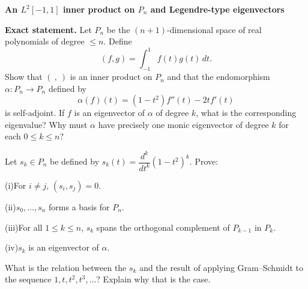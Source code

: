 \begin{problem}[CP-I-0041]
\label{prob:cp-i-0041}
\textbf{An $L^2[-1,1]$ inner product on $P_n$ and Legendre-type eigenvectors}

\textbf{Exact statement.}
\hspace*{1.5em}Let $P_n$ be the $(n+1)$-dimensional space of real polynomials of degree $\le n$. Define
\[
(f,g)=\int_{-1}^{1} f(t)g(t)\,dt.
\]
Show that $(\ ,\ )$ is an inner product on $P_n$ and that the endomorphism $\alpha:P_n\to P_n$ defined by
\[
\alpha(f)(t)=(1-t^2)f''(t)-2t f'(t)
\]
is self-adjoint.
If $f$ is an eigenvector of $\alpha$ of degree $k$, what is the corresponding eigenvalue?
Why must $\alpha$ have precisely one monic eigenvector of degree $k$ for each $0\le k\le n$?

Let $s_k\in P_n$ be defined by $s_k(t)=\dfrac{d^k}{dt^k}(1-t^2)^k$. Prove:

	\par\noindent (i)\quad For $i\ne j$, $(s_i,s_j)=0$.
	\par\noindent (ii)\quad $s_0,\dots,s_n$ forms a basis for $P_n$.
	\par\noindent (iii)\quad For all $1\le k\le n$, $s_k$ spans the orthogonal complement of $P_{k-1}$ in $P_k$.
	\par\noindent (iv)\quad $s_k$ is an eigenvector of $\alpha$.

What is the relation between the $s_k$ and the result of applying Gram--Schmidt to the sequence $1,t,t^2,t^3,\dots$?
Explain why that is the case.
\end{problem}

